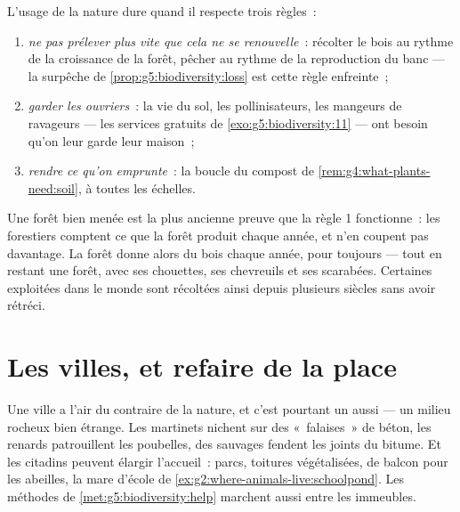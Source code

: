 \begin{proposition}\label{prop:g5:people-and-nature:lasting}
L'usage de la nature dure quand il respecte trois règles~:
\begin{enumerate}
  \item \emph{ne pas prélever plus vite que cela ne se
        renouvelle}~: récolter le bois au rythme de la croissance
        de la forêt, pêcher au rythme de la reproduction du banc
        --- la surpêche de \cref{prop:g5:biodiversity:loss} est
        cette règle enfreinte~;
  \item \emph{garder les ouvriers}~: la vie du sol, les
        pollinisateurs, les mangeurs de ravageurs --- les services
        gratuits de \cref{exo:g5:biodiversity:11} --- ont besoin
        qu'on leur garde leur maison~;
  \item \emph{rendre ce qu'on emprunte}~: la boucle du compost de
        \cref{rem:g4:what-plants-need:soil}, à toutes les échelles.
\end{enumerate}
\end{proposition}
\admitted

\begin{example}\label{ex:g5:people-and-nature:forester}
Une forêt bien menée est la plus ancienne preuve que la règle 1
fonctionne~: les forestiers comptent ce que la forêt produit chaque
année, et n'en coupent pas davantage. La forêt donne alors du bois
chaque année, pour toujours --- tout en restant une forêt, avec ses
chouettes, ses chevreuils et ses scarabées. Certaines 
exploitées dans le monde sont récoltées ainsi depuis plusieurs
siècles sans avoir rétréci.
\end{example}

\section{Les villes, et refaire de la place}

\begin{example}\label{ex:g5:people-and-nature:city}
Une ville a l'air du contraire de la nature, et c'est pourtant un
 aussi --- un milieu rocheux bien étrange. Les
martinets nichent sur des «~falaises~» de béton, les renards
patrouillent les poubelles, des  sauvages fendent les joints
du bitume. Et les citadins peuvent élargir l'accueil~: parcs,
toitures végétalisées,  de balcon pour les abeilles, la mare
d'école de \cref{ex:g2:where-animals-live:schoolpond}. Les méthodes
de \cref{met:g5:biodiversity:help} marchent aussi entre les
immeubles.
\end{example}

